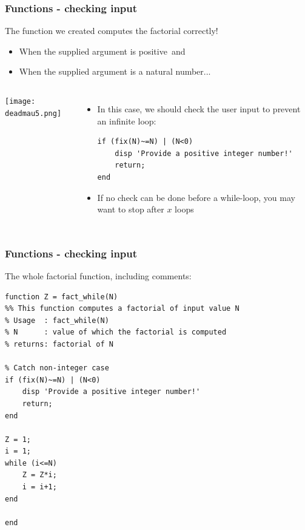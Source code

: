 \documentclass[11pt,table,final,fleqn,xcolor={usenames,dvipsnames},unknownkeysallowed,handout]{beamer}
\begin{document}
\begin{frame}[fragile]
 \frametitle{Functions - checking input}
  The function we created computes the factorial correctly! \pause
  \begin{itemize}
     \item When the supplied argument is positive\pause\ and \pause
     \item When the supplied argument is a natural number...
  \end{itemize}\pause
  \begin{columns}[T]
     \texttt{[image: deadmau5.png]}
    \pause
    \begin{itemize}[<+->]
     \item In this case, we should check the user input to prevent an infinite loop: \pause
     \begin{lstlisting} 
if (fix(N)~=N) | (N<0)
    disp 'Provide a positive integer number!'
    return;
end \end{lstlisting}
      \item If no check can be done before a while-loop, you may want to stop after $x$ loops
    \end{itemize}
  \end{columns}
\end{frame}

\begin{frame}[fragile]
 \frametitle{Functions - checking input}
  The whole factorial function, including comments:
     \begin{lstlisting}
function Z = fact_while(N)
%% This function computes a factorial of input value N
% Usage  : fact_while(N)
% N      : value of which the factorial is computed
% returns: factorial of N

% Catch non-integer case
if (fix(N)~=N) | (N<0)
    disp 'Provide a positive integer number!'
    return;
end

Z = 1;
i = 1;
while (i<=N)
    Z = Z*i;
    i = i+1;
end

end \end{lstlisting}
\end{frame}
\end{document}
